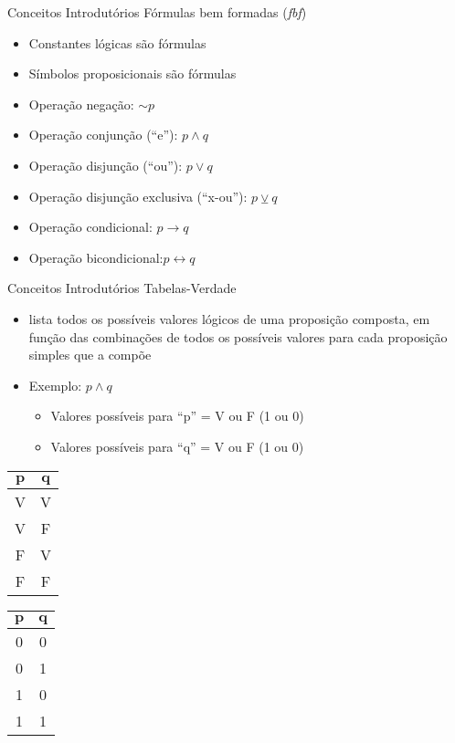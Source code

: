 \begin{frame}[t]{Conceitos Introdutórios} %
	Fórmulas bem formadas ({\em fbf})
	\begin{itemize}
	  \item Constantes lógicas são fórmulas
	  \item Símbolos proposicionais são fórmulas
	  \item Operação negação: $\sim p$
	  \item Operação conjunção (``e''): $p \wedge q$
	  \item Operação disjunção (``ou''): $p \vee q$
	  \item Operação disjunção exclusiva (``x-ou''): $p\veebar q$
	  \item Operação condicional: $p \rightarrow q$
	  \item Operação bicondicional:$p \leftrightarrow q$
	\end{itemize}
\end{frame}

\begin{frame}[t]{Conceitos Introdutórios} %
	Tabelas-Verdade
	\begin{itemize}
	  \item lista todos os possíveis valores lógicos de uma proposição composta, em função das combinações de todos os possíveis valores para cada proposição simples que a compõe
	  \item Exemplo:  $p \wedge q$
	    \begin{itemize}
	    \item Valores possíveis para ``p'' = V ou F (1 ou 0)
	    \item Valores possíveis para ``q'' = V ou F (1 ou 0)
	   \end{itemize}
	\end{itemize}

	\begin{minipage}[t]{0.45\textwidth}
	\begin{center}	
	\begin{tabular}{|c|c|}
	\hline
	$\mathbf{p}$ & $\mathbf{q}$ \\
	\hline
	V & V \\
	\hline
	V & F \\
	\hline
	F & V \\
	\hline
	F & F \\
	\hline
	\end{tabular}
	\end{center}
	\end{minipage}
	\begin{minipage}[t]{0.45\textwidth}
	\begin{center}	
	\begin{tabular}{|c|c|}
	\hline
	$\mathbf{p}$ & $\mathbf{q}$ \\
	\hline
	0 & 0 \\
	\hline
	0 & 1 \\
	\hline
	1 & 0 \\
	\hline
	1 & 1 \\
	\hline
	\end{tabular}
	\end{center}
	\end{minipage}
\end{frame}

